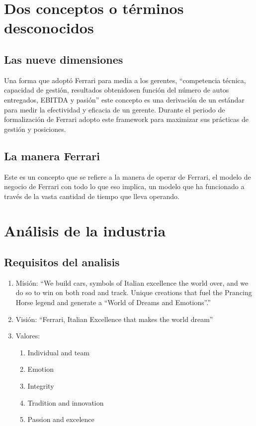 \documentclass{article}
\begin{document}
\section{Dos conceptos o términos desconocidos}
\subsection{Las nueve dimensiones}
Una forma que adoptó Ferrari para media a los gerentes, ``competencia técnica, capacidad de gestión, resultados obtenidosen función del número de autos entregados, EBITDA y pasión'' este concepto es una derivación de un estándar para medir la efectividad y eficacia de un gerente. Durante el periodo de formalización de Ferrari adopto este framework para maximizar sus prácticas de gestión y posiciones.


\subsection{La manera Ferrari}
Este es un concepto que se refiere a la manera de operar de Ferrari, el modelo de negocio de Ferrari con todo lo que eso implica, un modelo que ha funcionado a través de la vasta cantidad de tiempo que lleva operando. 


\section{Análisis de la industria}
\subsection*{Requisitos del analisis}
\begin{enumerate}
    \item Misión: ``We build cars, symbols of Italian excellence the world over, and we do so to win on both road and track. Unique creations that fuel the Prancing Horse legend and generate a “World of Dreams and Emotions”.''
    \item Visión: ``Ferrari, Italian Excellence that makes the world dream''
    \item Valores: 
        \begin{enumerate}
            \item Individual and team 
            \item Emotion 
            \item Integrity 
            \item Tradition and innovation 
            \item Passion and excelence 
        \end{enumerate}
\end{enumerate}
\end{document}

